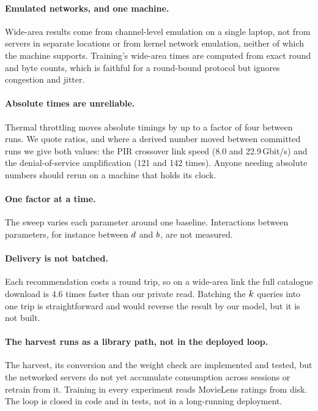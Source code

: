 \paragraph{Emulated networks, and one machine.} Wide-area results come from
channel-level emulation on a single laptop, not from servers in separate
locations or from kernel network emulation, neither of which the machine
supports. Training's wide-area times are computed from exact round and byte
counts, which is faithful for a round-bound protocol but ignores congestion and
jitter.

\paragraph{Absolute times are unreliable.} Thermal throttling moves absolute
timings by up to a factor of four between runs. We quote ratios, and where a
derived number moved between committed runs we give both values: the PIR
crossover link speed (8.0 and 22.9\,Gbit/s) and the denial-of-service
amplification (121 and 142 times). Anyone needing absolute numbers should rerun
on a machine that holds its clock.

\paragraph{One factor at a time.} The sweep varies each parameter around one
baseline. Interactions between parameters, for instance between $d$ and
$b$, are not measured.

\paragraph{Delivery is not batched.} Each recommendation costs a round trip, so
on a wide-area link the full catalogue download is 4.6 times faster than our
private read. Batching the $k$ queries into one trip is straightforward and
would reverse the result by our model, but it is not built.

\paragraph{The harvest runs as a library path, not in the deployed loop.} The
harvest, its conversion and the weight check are implemented and tested, but the
networked servers do not yet accumulate consumption across sessions or retrain
from it. Training in every experiment reads MovieLens ratings from disk. The
loop is closed in code and in tests, not in a long-running deployment.

